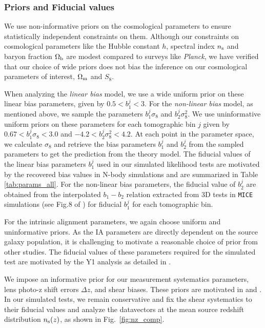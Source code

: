 \documentclass[fleqn,usenatbib]{mnras}
\newcommand{\mice}{\texttt{MICE} }
\begin{document}
\subsubsection{Priors and Fiducial values}
\label{sec:prior}
We use non-informative priors on the cosmological parameters to ensure statistically independent constraints on them. Although our constraints on cosmological parameters like the Hubble constant $h$, spectral index $n_{\rm s}$ and baryon fraction $\Omega_{\rm b}$ are modest compared to surveys like \textit{Planck}, we have verified that our choice of wide priors does not bias the inference on our cosmological parameters of interest, $\Omega_{\rm m}$ and $S_8$. 

When analyzing the \textit{linear bias} model, we use a wide uniform prior on these linear bias parameters, given by $0.5 < b^{j}_1 < 3$. For the \textit{non-linear bias} model, as mentioned above, we sample the parameters $b^{j}_1 \sigma_8$ and $b^{j}_2 \sigma^2_8$. We use uninformative uniform priors on these parameters for each tomographic bin $j$ given by $0.67 < b^{j}_1 \sigma_8 < 3.0$ and $-4.2 < b^{j}_2 \sigma^2_8 < 4.2$. At each point in the parameter space, we calculate  $\sigma_8$ and retrieve the bias parameters $b^{j}_1$ and $b^{j}_2$ from the sampled parameters to get the prediction from the theory model. The fiducial values of the linear bias parameters $b^{j}_1$ used in our simulated likelihood tests are motivated by the  recovered bias values in N-body simulations and are summarized in Table \ref{tab:params_all}. 
For the non-linear bias parameters, the fiducial value of $b^{j}_2$ are obtained from the interpolated $b_1-b_2$ relation extracted from 3D tests in \mice simulations (see Fig.8 of \cite{p2020perturbation}) for fiducial $b^j_1$ for each tomographic bin.

For the intrinsic alignment parameters, we again choose uniform and uninformative priors. As the IA parameters are directly dependent on the source galaxy population, it is challenging to motivate a reasonable choice of prior from other studies. The fiducial values of these parameters required for the simulated test are motivated by the Y1 analysis as detailed in \cite{Samuroff_2019}.

We impose an informative prior for our measurement systematics parameters, lens photo-z shift errors $\Delta z$, and shear biases. These priors are motivated in \citet{y3-imagesims} and \citet{y3-shapecatalog}. 
In our simulated tests, we remain conservative and fix the shear systematics to their fiducial values and analyze the datavectors at the mean source redshift distribution $n_{\rm s}(z)$, as shown in Fig.~\ref{fig:nz_comp}.  
\end{document}
